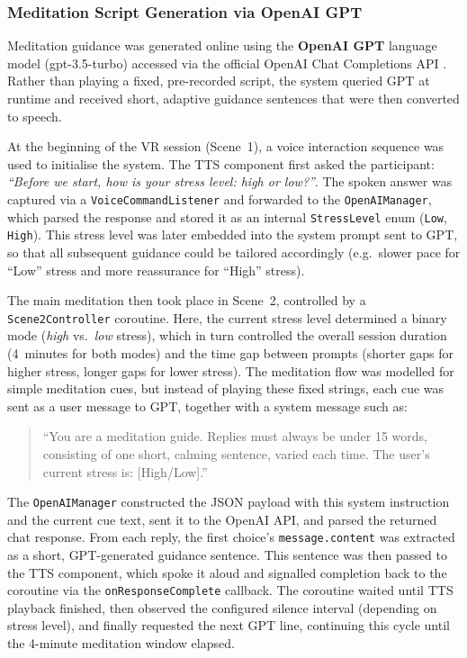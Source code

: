 \subsubsection{Meditation Script Generation via OpenAI GPT}

Meditation guidance was generated online using the \textbf{OpenAI GPT} language model (gpt-3.5-turbo) accessed via the official OpenAI Chat Completions API \cite{openai_gpt}. 
Rather than playing a fixed, pre-recorded script, the system queried GPT at runtime and received short, adaptive guidance sentences that were then converted to speech.

At the beginning of the VR session (Scene~1), a voice interaction sequence was used to initialise the system. 
The TTS component first asked the participant: \emph{``Before we start, how is your stress level: high or low?''}. 
The spoken answer was captured via a \texttt{VoiceCommandListener} and forwarded to the \texttt{OpenAIManager}, which parsed the response and stored it as an internal \texttt{StressLevel} enum (\texttt{Low}, \texttt{High}). 
This stress level was later embedded into the system prompt sent to GPT, so that all subsequent guidance could be tailored accordingly (e.g.\ slower pace for ``Low'' stress and more reassurance for ``High'' stress).

The main meditation then took place in Scene~2, controlled by a \texttt{Scene2Controller} coroutine. 
Here, the current stress level determined a binary mode (\emph{high} vs.\ \emph{low} stress), which in turn controlled the overall session duration (4~minutes for both modes) and the time gap between prompts (shorter gaps for higher stress, longer gaps for lower stress). 
The meditation flow was modelled for simple meditation cues, but instead of playing these fixed strings, each cue was sent as a user message to GPT, together with a system message such as:

\begin{quote}
``You are a meditation guide. Replies must always be under 15 words, consisting of one short, calming sentence, varied each time. The user's current stress is: [High/Low].''
\end{quote}

The \texttt{OpenAIManager} constructed the JSON payload with this system instruction and the current cue text, sent it to the OpenAI API, and parsed the returned chat response. 
From each reply, the first choice's \texttt{message.content} was extracted as a short, GPT-generated guidance sentence. 
This sentence was then passed to the TTS component, which spoke it aloud and signalled completion back to the coroutine via the \texttt{onResponseComplete} callback. 
The coroutine waited until TTS playback finished, then observed the configured silence interval (depending on stress level), and finally requested the next GPT line, continuing this cycle until the 4-minute meditation window elapsed.

